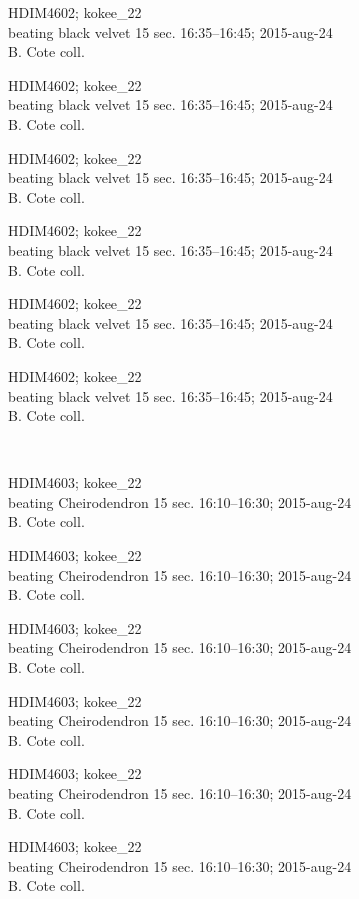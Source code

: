 \documentclass[2pt]{extarticle}
\begin{document}
\noindent
\parbox{0.16\textwidth}{\tiny \raggedright \rule[-0.3\baselineskip]{0pt}{10pt}HDIM4602; kokee\_22\\ beating black velvet 15 sec. 16:35--16:45; 2015-aug-24\\ B. Cote coll.}
\parbox{0.16\textwidth}{\tiny \raggedright \rule[-0.3\baselineskip]{0pt}{10pt}HDIM4602; kokee\_22\\ beating black velvet 15 sec. 16:35--16:45; 2015-aug-24\\ B. Cote coll.}
\parbox{0.16\textwidth}{\tiny \raggedright \rule[-0.3\baselineskip]{0pt}{10pt}HDIM4602; kokee\_22\\ beating black velvet 15 sec. 16:35--16:45; 2015-aug-24\\ B. Cote coll.}
\parbox{0.16\textwidth}{\tiny \raggedright \rule[-0.3\baselineskip]{0pt}{10pt}HDIM4602; kokee\_22\\ beating black velvet 15 sec. 16:35--16:45; 2015-aug-24\\ B. Cote coll.}
\parbox{0.16\textwidth}{\tiny \raggedright \rule[-0.3\baselineskip]{0pt}{10pt}HDIM4602; kokee\_22\\ beating black velvet 15 sec. 16:35--16:45; 2015-aug-24\\ B. Cote coll.}
\parbox{0.16\textwidth}{\tiny \raggedright \rule[-0.3\baselineskip]{0pt}{10pt}HDIM4602; kokee\_22\\ beating black velvet 15 sec. 16:35--16:45; 2015-aug-24\\ B. Cote coll.} \\ 
\vspace{0.001in} 

\noindent
\parbox{0.16\textwidth}{\tiny \raggedright \rule[-0.3\baselineskip]{0pt}{10pt}HDIM4603; kokee\_22\\ beating Cheirodendron 15 sec. 16:10--16:30; 2015-aug-24\\ B. Cote coll.}
\parbox{0.16\textwidth}{\tiny \raggedright \rule[-0.3\baselineskip]{0pt}{10pt}HDIM4603; kokee\_22\\ beating Cheirodendron 15 sec. 16:10--16:30; 2015-aug-24\\ B. Cote coll.}
\parbox{0.16\textwidth}{\tiny \raggedright \rule[-0.3\baselineskip]{0pt}{10pt}HDIM4603; kokee\_22\\ beating Cheirodendron 15 sec. 16:10--16:30; 2015-aug-24\\ B. Cote coll.}
\parbox{0.16\textwidth}{\tiny \raggedright \rule[-0.3\baselineskip]{0pt}{10pt}HDIM4603; kokee\_22\\ beating Cheirodendron 15 sec. 16:10--16:30; 2015-aug-24\\ B. Cote coll.}
\parbox{0.16\textwidth}{\tiny \raggedright \rule[-0.3\baselineskip]{0pt}{10pt}HDIM4603; kokee\_22\\ beating Cheirodendron 15 sec. 16:10--16:30; 2015-aug-24\\ B. Cote coll.}
\parbox{0.16\textwidth}{\tiny \raggedright \rule[-0.3\baselineskip]{0pt}{10pt}HDIM4603; kokee\_22\\ beating Cheirodendron 15 sec. 16:10--16:30; 2015-aug-24\\ B. Cote coll.} \\ 
\vspace{0.001in} 
\end{document}
